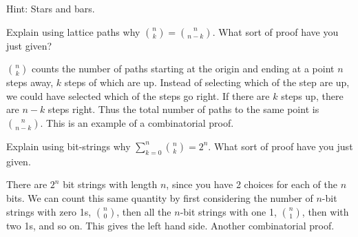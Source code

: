\begin{squestions}

  \begin{answer}
  Hint: Stars and bars.
  \end{answer}



\question Explain using lattice paths why ${n \choose k} = {n \choose n-k}$.  What sort of proof have you just given?

  \begin{answer}
   ${n\choose k}$ counts the number of paths starting at the origin and ending at a point $n$ steps away, $k$ steps of which are up.  Instead of selecting which of the step are up, we could have selected which of the steps go right.  If there are $k$ steps up, there are $n-k$ steps right.  Thus the total number of paths to the same point is ${n \choose n-k}$.  This is an example of a combinatorial proof.
  \end{answer}


\question Explain using bit-strings why $\sum_{k=0}^n {n \choose k} = 2^n$.  What sort of proof have you just given.

  \begin{answer}
   There are $2^n$ bit strings with length $n$, since you have 2 choices for each of the $n$ bits.  We can count this same quantity by first considering the number of $n$-bit strings with zero 1s, ${n\choose 0}$, then all the $n$-bit strings with one 1, ${n \choose 1}$, then with two 1s, and so on.  This gives the left hand side.  Another combinatorial proof.
  \end{answer}




\end{squestions}
